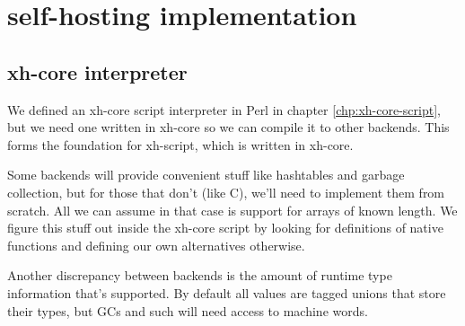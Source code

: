 \documentclass{report}
\begin{document}
\part{self-hosting implementation}\label{part:self-hosting-implementation}
\chapter{xh-core interpreter}\label{chp:xh-core-self-hosting}
  We defined an xh-core script interpreter in Perl in chapter
  \ref{chp:xh-core-script}, but we need one written in xh-core so we can
  compile it to other backends. This forms the foundation for xh-script, which
  is written in xh-core.

  Some backends will provide convenient stuff like hashtables and garbage
  collection, but for those that don't (like C), we'll need to implement them
  from scratch. All we can assume in that case is support for arrays of known
  length. We figure this stuff out inside the xh-core script by looking for
  definitions of native functions and defining our own alternatives otherwise.

  Another discrepancy between backends is the amount of runtime type
  information that's supported. By default all values are tagged unions that
  store their types, but GCs and such will need access to machine words.
\end{document}
